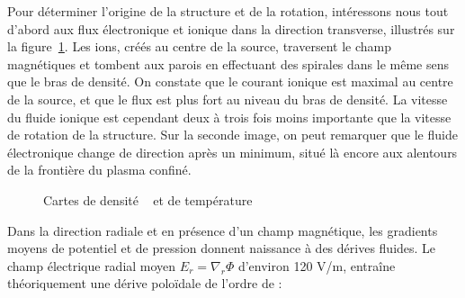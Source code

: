 \begin{refsection}
Pour déterminer l'origine de la structure et de la rotation, intéressons nous
tout d'abord aux flux électronique et ionique dans la direction
transverse, illustrés sur la figure~\ref{4-CybeleCarteFlux}.
Les ions, créés au centre de la source, traversent le champ magnétiques et
tombent aux parois en effectuant des spirales dans le même sens que le bras de
densité. On constate que le courant ionique est maximal au centre de la source,
et que le flux est plus fort au niveau du bras de densité. La
vitesse du fluide ionique est cependant deux à trois fois moins importante que la vitesse de rotation de
la structure. Sur la seconde image, on peut remarquer que le fluide électronique
change de direction après un minimum, situé là encore aux alentours de la
frontière du plasma confiné.

\begin{figure}[!htbp]
  \centering
    \caption{Cartes de densité ~ et de
    température }
    \label{4-CybeleCarteFlux}
\end{figure}
Dans la direction radiale et en présence d'un champ magnétique, les gradients
moyens de potentiel et de pression donnent naissance à des dérives
fluides. 
Le champ électrique radial moyen $E_r=\nabla_r\Phi$ d'environ 120 V/m,
entraîne théoriquement une dérive poloïdale de l'ordre de :


\end{refsection}

